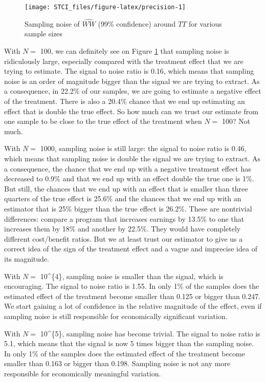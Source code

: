 \documentclass[]{book}
\theoremstyle{definition}
\theoremstyle{definition}
\theoremstyle{definition}
\theoremstyle{remark}
\begin{document}
\begin{figure}[htbp]

{\centering \texttt{[image: STCI\_files/figure-latex/precision-1]} 

}

\caption{Sampling noise of $\hat{WW}$ (99\% confidence) around $TT$ for various sample sizes}\label{fig:precision}
\end{figure}

With \(N=\) 100, we can definitely see on Figure \ref{fig:precision}
that sampling noise is ridiculously large, especially compared with the
treatment effect that we are trying to estimate. The signal to noise
ratio is 0.16, which means that sampling noise is an order of magnitude
bigger than the signal we are trying to extract. As a consequence, in
22.2\% of our samples, we are going to estimate a negative effect of the
treatment. There is also a 20.4\% chance that we end up estimating an
effect that is double the true effect. So how much can we trust our
estimate from one sample to be close to the true effect of the treatment
when \(N=\) 100? Not much.

With \(N=\) 1000, sampling noise is still large: the signal to noise
ratio is 0.46, which means that sampling noise is double the signal we
are trying to extract. As a consequence, the chance that we end up with
a negative treatment effect has decreased to 0.9\% and that we end up
with an effect double the true one is 1\%. But still, the chances that
we end up with an effect that is smaller than three quarters of the true
effect is 25.6\% and the chances that we end up with an estimator that
is 25\% bigger than the true effect is 26.2\%. These are nontrivial
differences: compare a program that increases earnings by 13.5\% to one
that increases them by 18\% and another by 22.5\%. They would have
completely different cost/benefit ratios. But we at least trust our
estimator to give us a correct idea of the sign of the treatment effect
and a vague and imprecise idea of its magnitude.

With \(N=\) 10\^{}\{4\}, sampling noise is smaller than the signal,
which is encouraging. The signal to noise ratio is 1.55. In only 1\% of
the samples does the estimated effect of the treatment become smaller
than 0.125 or bigger than 0.247. We start gaining a lot of confidence in
the relative magnitude of the effect, even if sampling noise is still
responsible for economically significant variation.

With \(N=\) 10\^{}\{5\}, sampling noise has become trivial. The signal
to noise ratio is 5.1, which means that the signal is now 5 times bigger
than the sampling noise. In only 1\% of the samples does the estimated
effect of the treatment become smaller than 0.163 or bigger than 0.198.
Sampling noise is not any more responsible for economically meaningful
variation.
\end{document}
